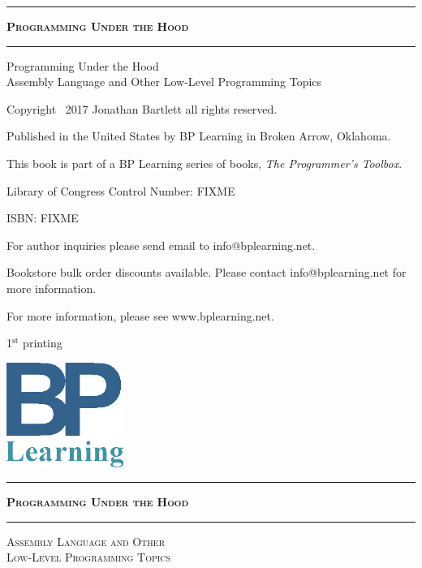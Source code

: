 \begin{titlepage}

\thispagestyle{empty}
\vspace*{\fill}
\begin{center}
\hrule
{\LARGE \textsc{\textbf{Programming Under the Hood}}}
\baselineskip
\hrule
\end{center}
\vspace*{\fill}

\clearpage %

\thispagestyle{empty}
\vspace*{\fill}

{\small
Programming Under the Hood \\
Assembly Language and Other Low-Level Programming Topics

Copyright \textcopyright\ 2017 Jonathan Bartlett all rights reserved.

Published in the United States by BP Learning in Broken Arrow, Oklahoma.

This book is part of a BP Learning series of books, \textit{The Programmer's Toolbox}.

Library of Congress Control Number: FIXME

ISBN: FIXME

For author inquiries please send email to info@bplearning.net.  

Bookstore bulk order discounts available.  Please contact info@bplearning.net for more information.

For more information, please see www.bplearning.net.

1$^{\textrm{st}}$ printing
}
\baselineskip

\includegraphics[width=1.5in]{bplearning.png}


\vspace*{\fill}

\clearpage %

\thispagestyle{empty}
\vspace*{\fill}
\begin{center}
\hrule
{\LARGE \textsc{\textbf{Programming Under the Hood}}}
\baselineskip
\hrule
{}\baselineskip
{\Large \textsc{Assembly Language and Other \\ Low-Level Programming Topics
}}


\end{center}
\end{titlepage}
